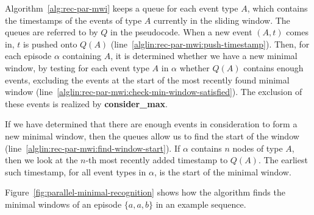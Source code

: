 Algorithm~\ref{alg:rec-par-mwi} keeps a queue for each event type $ A $, which contains the timestamps of the events of type $ A $ currently in the sliding window. The queues are referred to by $ Q $ in the pseudocode. When a new event $ (A, t) $ comes in, $ t $ is pushed onto $ Q(A) $ (line~\ref{alglin:rec-par-mwi:push-timestamp}). Then, for each episode $ \alpha $ containing $ A $, it is determined whether we have a new minimal window, by testing for each event type $ A $ in $ \alpha $ whether $ Q(A) $ contains enough events, excluding the events at the start of the most recently found minimal window (line~\ref{alglin:rec-par-mwi:check-min-window-satisfied}). The exclusion of these events is realized by \textbf{consider\_max}.

If we have determined that there are enough events in consideration to form a new minimal window, then the queues allow us to find the start of the window (line~\ref{alglin:rec-par-mwi:find-window-start}). If $ \alpha $ contains $ n $ nodes of type $ A $, then we look at the $ n $-th most recently added timestamp to $ Q(A) $. The earliest such timestamp, for all event types in $ \alpha $, is the start of the minimal window.

Figure~\ref{fig:parallel-minimal-recognition} shows how the algorithm finds the minimal windows of an episode $ \{ a, a, b \} $ in an example sequence.

